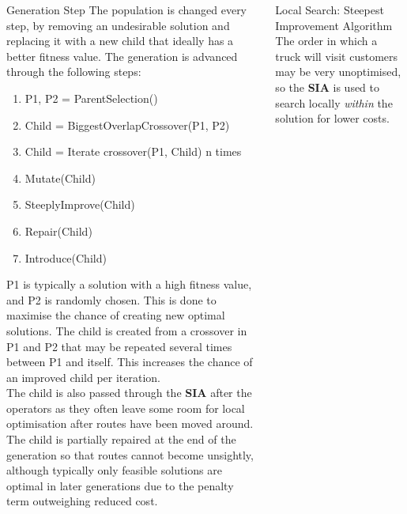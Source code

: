 \documentclass[ %
                    author={Callum Mann},
                     title={Genetic algorithm for the CVRP},
                  subtitle={Capacitated Vehicle Routing Problem},
                      type={Heuristic},
                      year={2016}]{poster}
\begin{document}
\begin{frame}{}
\begin{columns}[t]
\begin{column}{0.422\linewidth}
    \vfill

    \begin{block}{\Large Generation Step}
      The population is changed every step, by removing an undesirable solution and
      replacing it with a new child that ideally has a better fitness value. The generation
      is advanced through the following steps:
      \begin{enumerate}
        \item P1, P2 = ParentSelection()
        \item Child = BiggestOverlapCrossover(P1, P2)
        \item Child = Iterate crossover(P1, Child) n times
        \item Mutate(Child)
        \item SteeplyImprove(Child)
        \item Repair(Child)
        \item Introduce(Child)
      \end{enumerate}
      \vspace{1cm}

      P1 is typically a solution with a high fitness value, and P2 is randomly chosen.
      This is done to maximise the chance of creating new optimal solutions. The child
      is created from a crossover in P1 and P2 that may be repeated several times between
      P1 and itself. This increases the chance of an improved child per iteration.
      \vspace{1cm} \\
      The child is also passed through the \textbf{SIA} after the operators as
      they often leave some room for local optimisation after routes have been
      moved around. The child is partially repaired at the end of the generation
      so that routes cannot become unsightly,
      although typically only feasible solutions are optimal in later generations
      due to the penalty term outweighing reduced cost.

    \end{block}
    \vspace{1cm}

  \end{column}

  \begin{column}{0.422\linewidth}
    \begin{block}{\Large Local Search: Steepest Improvement Algorithm}
      The order in which a truck will visit customers may be very unoptimised, so the \textbf{SIA} is used
      to search locally \textit{within} the solution for lower costs.
    \end{block}
    \vspace{1cm}


\end{column}
\end{columns}
\end{frame}
\end{document}
